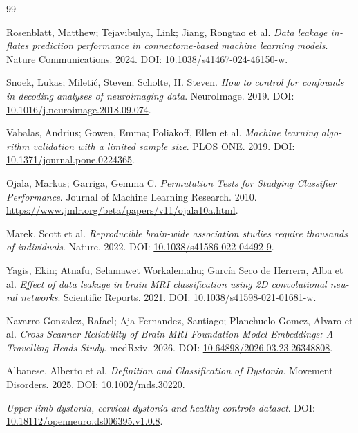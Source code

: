 \begin{thebibliography}{99}
\begin{otherlanguage}{english}
Rosenblatt, Matthew; Tejavibulya, Link; Jiang, Rongtao et al. \textit{{Data leakage inflates prediction performance in connectome-based machine learning models}}. Nature Communications. 2024. DOI: \url{10.1038/s41467-024-46150-w}.
\end{otherlanguage}
\begin{otherlanguage}{english}
Snoek, Lukas; Mileti\'{c}, Steven; Scholte, H. Steven. \textit{{How to control for confounds in decoding analyses of neuroimaging data}}. NeuroImage. 2019. DOI: \url{10.1016/j.neuroimage.2018.09.074}.
\end{otherlanguage}
\begin{otherlanguage}{english}
Vabalas, Andrius; Gowen, Emma; Poliakoff, Ellen et al. \textit{{Machine learning algorithm validation with a limited sample size}}. PLOS ONE. 2019. DOI: \url{10.1371/journal.pone.0224365}.
\end{otherlanguage}
\begin{otherlanguage}{english}
Ojala, Markus; Garriga, Gemma C. \textit{{Permutation Tests for Studying Classifier Performance}}. Journal of Machine Learning Research. 2010. \url{https://www.jmlr.org/beta/papers/v11/ojala10a.html}.
\end{otherlanguage}
\begin{otherlanguage}{english}
Marek, Scott et al. \textit{{Reproducible brain-wide association studies require thousands of individuals}}. Nature. 2022. DOI: \url{10.1038/s41586-022-04492-9}.
\end{otherlanguage}
\begin{otherlanguage}{english}
Yagis, Ekin; Atnafu, Selamawet Workalemahu; {Garc\'{i}a Seco de Herrera}, Alba et al. \textit{{Effect of data leakage in brain MRI classification using 2D convolutional neural networks}}. Scientific Reports. 2021. DOI: \url{10.1038/s41598-021-01681-w}.
\end{otherlanguage}
\begin{otherlanguage}{english}
Navarro-Gonzalez, Rafael; Aja-Fernandez, Santiago; Planchuelo-Gomez, Alvaro et al. \textit{{Cross-Scanner Reliability of Brain MRI Foundation Model Embeddings: A Travelling-Heads Study}}. medRxiv. 2026. DOI: \url{10.64898/2026.03.23.26348808}.
\end{otherlanguage}
\begin{otherlanguage}{english}
Albanese, Alberto et al. \textit{{Definition and Classification of Dystonia}}. Movement Disorders. 2025. DOI: \url{10.1002/mds.30220}.
\end{otherlanguage}
\begin{otherlanguage}{english}
\textit{{Upper limb dystonia, cervical dystonia and healthy controls dataset}}. DOI: \url{10.18112/openneuro.ds006395.v1.0.8}.
\end{otherlanguage}
\end{thebibliography}

